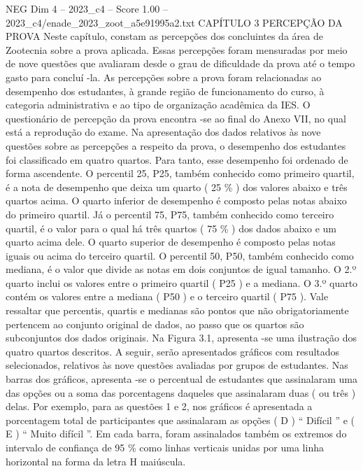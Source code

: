 \begin{textsample}{NEG Dim 4 – 2023\_c4 – Score 1.00 – 2023\_c4/enade\_2023\_zoot\_a5e91995a2.txt}  \label{ex:f4_neg_189}
CAPÍTULO 3 PERCEPÇÃO DA PROVA Neste capítulo, constam as percepções dos concluintes da área de Zootecnia sobre a prova aplicada.
Essas percepções foram mensuradas por meio de nove questões que avaliaram desde o grau de dificuldade da prova até o tempo gasto para concluí -la.
As percepções sobre a prova foram relacionadas ao desempenho dos estudantes, à grande região de funcionamento do curso, à categoria administrativa e ao tipo de organização acadêmica da IES.
O questionário de percepção da prova encontra -se ao final do Anexo VII, no qual está a reprodução do exame.
Na apresentação dos dados relativos às nove questões sobre as percepções a respeito da prova, o desempenho dos estudantes foi classificado em quatro quartos.
Para tanto, esse desempenho foi ordenado de forma ascendente.
O percentil 25, P25, também conhecido como primeiro quartil, é a nota de desempenho que deixa um quarto ( 25 \% ) dos valores abaixo e três quartos acima.
O quarto inferior de desempenho é composto pelas notas abaixo do primeiro quartil.
Já o percentil 75, P75, também conhecido como terceiro quartil, é o valor para o qual há três quartos ( 75 \% ) dos dados abaixo e um quarto acima dele.
O quarto superior de desempenho é composto pelas notas iguais ou acima do terceiro quartil.
O percentil 50, P50, também conhecido como mediana, é o valor que divide as notas em dois conjuntos de igual tamanho.
O 2.º quarto inclui os valores entre o primeiro quartil ( P25 ) e a mediana.
O 3.º quarto contém os valores entre a mediana ( P50 ) e o terceiro quartil ( P75 ).
Vale ressaltar que percentis, quartis e medianas são pontos que não obrigatoriamente pertencem ao conjunto original de dados, ao passo que os quartos são subconjuntos dos dados originais.
Na Figura 3.1, apresenta -se uma ilustração dos quatro quartos descritos.
A seguir, serão apresentados gráficos com resultados selecionados, relativos às nove questões avaliadas por grupos de estudantes.
Nas barras dos gráficos, apresenta -se o percentual de estudantes que assinalaram uma das opções ou a soma das porcentagens daqueles que assinalaram duas ( ou três ) delas.
Por exemplo, para as questões 1 e 2, nos gráficos é apresentada a porcentagem total de participantes que assinalaram as opções ( D ) “ Difícil ” e ( E ) “ Muito difícil ”.
Em cada barra, foram assinalados também os extremos do intervalo de confiança de 95 \% como linhas verticais unidas por uma linha horizontal na forma da letra H maiúscula.

\end{textsample}
